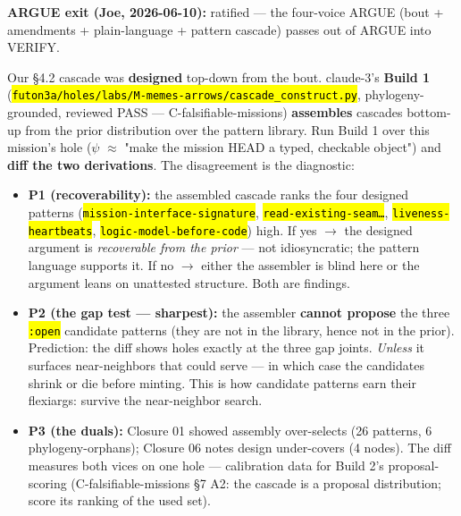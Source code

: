 \documentclass[11pt,oneside]{article}
\newcommand{\scopehl}[1]{\texttt{\hl{#1}}}
\begin{document}
\begin{phasebox}[title={5. VERIFY (opened 2026-06-10) --- two derivations of one argument}]

\textbf{ARGUE exit (Joe, 2026-06-10):} ratified --- the four-voice ARGUE (bout +
amendments + plain-language + pattern cascade) passes out of ARGUE into VERIFY.

\begin{subbox}[title={V1 --- the convergence probe (the centerpiece; per combining-methods-as-diagnostic)}]

Our \S{}4.2 cascade was \textbf{designed} top-down from the bout. claude-3's \textbf{Build 1}
(\scopehl{futon3a/holes/labs/M-memes-arrows/cascade\_construct.py}, phylogeny-grounded,
reviewed PASS --- C-falsifiable-missions) \textbf{assembles} cascades bottom-up from
the prior distribution over the pattern library. Run Build 1 over this
mission's hole ($\psi$ $\approx$ "make the mission HEAD a typed, checkable object") and
\textbf{diff the two derivations}. The disagreement is the diagnostic:

\begin{itemize}[leftmargin=1.2em,itemsep=1pt]
\item \textbf{P1 (recoverability):} the assembled cascade ranks the four designed patterns (\scopehl{mission-interface-signature}, \scopehl{read-existing-seam\ldots{}}, \scopehl{liveness-heartbeats}, \scopehl{logic-model-before-code}) high. If yes $\rightarrow$ the designed argument is \emph{recoverable from the prior} --- not idiosyncratic; the pattern language supports it. If no $\rightarrow$ either the assembler is blind here or the argument leans on unattested structure. Both are findings.
\item \textbf{P2 (the gap test --- sharpest):} the assembler \textbf{cannot propose} the three \scopehl{:open} candidate patterns (they are not in the library, hence not in the prior). Prediction: the diff shows holes exactly at the three gap joints. \emph{Unless} it surfaces near-neighbors that could serve --- in which case the candidates shrink or die before minting. This is how candidate patterns earn their flexiargs: survive the near-neighbor search.
\item \textbf{P3 (the duals):} Closure 01 showed assembly over-selects (26 patterns, 6 phylogeny-orphans); Closure 06 notes design under-covers (4 nodes). The diff measures both vices on one hole --- calibration data for Build 2's proposal-scoring (C-falsifiable-missions \S{}7 A2: the cascade is a proposal distribution; score its ranking of the used set).
\end{itemize}


\end{subbox}
\end{phasebox}
\end{document}
